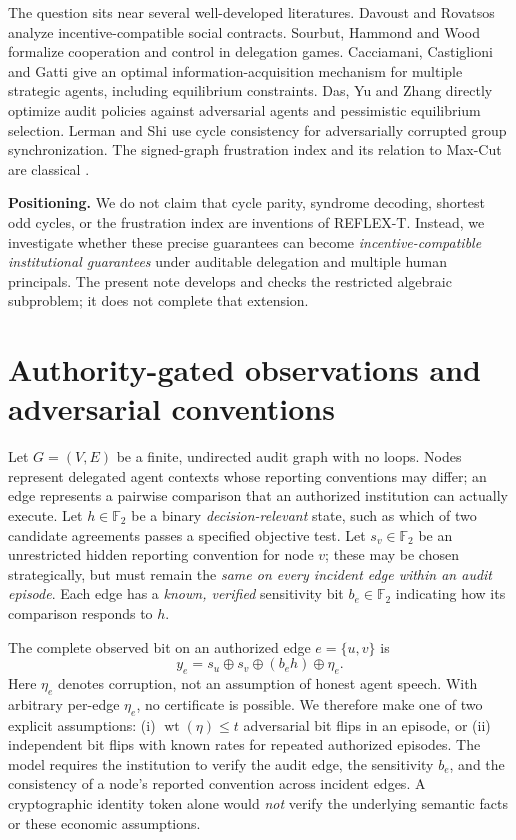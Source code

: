\documentclass[10pt,a4paper]{article}
\theoremstyle{definition}\newtheorem{definition}[theorem]{Definition}
\newcommand{\F}{\mathbb F_2}
\newcommand{\wt}{\operatorname{wt}}
\begin{document}
The question sits near several well-developed literatures. Davoust and Rovatsos \cite{davoust2020} analyze incentive-compatible social contracts. Sourbut, Hammond and Wood \cite{sourbut2024} formalize cooperation and control in delegation games. Cacciamani, Castiglioni and Gatti \cite{cacciamani2024} give an optimal information-acquisition mechanism for multiple strategic agents, including equilibrium constraints. Das, Yu and Zhang \cite{das2026} directly optimize audit policies against adversarial agents and pessimistic equilibrium selection. Lerman and Shi \cite{lerman2022} use cycle consistency for adversarially corrupted group synchronization. The signed-graph frustration index and its relation to Max-Cut are classical \cite{aref2019}.

\textbf{Positioning.} We do not claim that cycle parity, syndrome decoding, shortest odd cycles, or the frustration index are inventions of REFLEX-T. Instead, we investigate whether these precise guarantees can become \emph{incentive-compatible institutional guarantees} under auditable delegation and multiple human principals. The present note develops and checks the restricted algebraic subproblem; it does not complete that extension.

\section{Authority-gated observations and adversarial conventions}
Let $G=(V,E)$ be a finite, undirected audit graph with no loops. Nodes represent delegated agent contexts whose reporting conventions may differ; an edge represents a pairwise comparison that an authorized institution can actually execute. Let $h\in\F$ be a binary \emph{decision-relevant} state, such as which of two candidate agreements passes a specified objective test. Let $s_v\in\F$ be an unrestricted hidden reporting convention for node $v$; these may be chosen strategically, but must remain the \emph{same on every incident edge within an audit episode}. Each edge has a \emph{known, verified} sensitivity bit $b_e\in\F$ indicating how its comparison responds to $h$.

The complete observed bit on an authorized edge $e=\{u,v\}$ is
\begin{equation}\label{eq:obs}
 y_e=s_u\oplus s_v\oplus(b_e h)\oplus\eta_e.
\end{equation}
Here $\eta_e$ denotes corruption, not an assumption of honest agent speech. With arbitrary per-edge $\eta_e$, no certificate is possible. We therefore make one of two explicit assumptions: (i) $\wt(\eta)\le t$ adversarial bit flips in an episode, or (ii) independent bit flips with known rates for repeated authorized episodes. The model requires the institution to verify the audit edge, the sensitivity $b_e$, and the consistency of a node's reported convention across incident edges. A cryptographic identity token alone would \emph{not} verify the underlying semantic facts or these economic assumptions.
\end{document}
